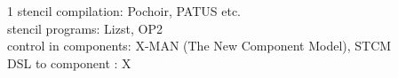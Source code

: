 1 stencil compilation: Pochoir, PATUS etc.\\
stencil programs: Lizst, OP2\\
control in components: X-MAN (The New Component Model), STCM\\
DSL to component : X
